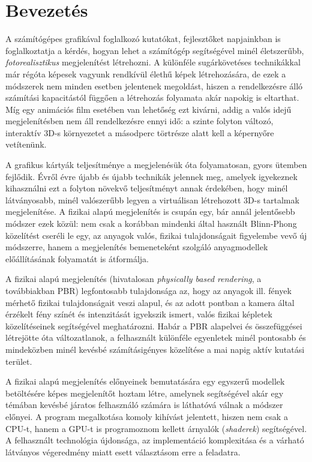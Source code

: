 \documentclass[12pt,oneside]{book}
\begin{document}
\chapter{Bevezetés}
A számítógépes grafikával foglalkozó kutatókat, fejlesztőket napjainkban is foglalkoztatja a kérdés, hogyan lehet a számítógép segítségével minél életszerűbb, \textit{fotorealisztikus} megjelenítést létrehozni. A különféle sugárkövetéses technikákkal már régóta képesek vagyunk rendkívül élethű képek létrehozására, de ezek a módszerek nem minden esetben jelentenek megoldást, hiszen a rendelkezésre álló számítási kapacitástól függően a létrehozás folyamata akár napokig is eltarthat. Míg egy animációs film esetében van lehetőség ezt kivárni, addig a valós idejű megjelenítésben nem áll rendelkezésre ennyi idő: a szinte folyton változó, interaktív 3D-s környezetet a másodperc törtrésze alatt kell a képernyőre vetítenünk.

A grafikus kártyák teljesítménye a megjelenésük óta folyamatosan, gyors ütemben fejlődik. Évről évre újabb és újabb technikák jelennek meg, amelyek igyekeznek kihasználni ezt a folyton növekvő teljesítményt annak érdekében, hogy minél látványosabb, minél valószerűbb legyen a virtuálisan létrehozott 3D-s tartalmak megjelenítése. A fizikai alapú megjelenítés is csupán egy, bár annál jelentősebb módszer ezek közül: nem csak a korábban mindenki által használt Blinn-Phong közelítést cseréli le egy, az anyagok valós, fizikai tulajdonságait figyelembe vevő új módszerre, hanem a megjelenítés bemeneteként szolgáló anyagmodellek előállításának folyamatát is átformálja.

A fizikai alapú megjelenítés (hivatalosan \textit{physically based rendering}, a továbbiakban PBR) legfontosabb tulajdonsága az, hogy az anyagok ill. fények mérhető fizikai tulajdonságait veszi alapul, és az adott pontban a kamera által érzékelt fény színét és intenzitását igyekszik ismert, valós fizikai képletek közelítéseinek segítségével meghatározni. Habár a PBR alapelvei és összefüggései létrejötte óta változatlanok, a felhasznált különféle egyenletek minél pontosabb és mindeközben minél kevésbé számításigényes közelítése a mai napig aktív kutatási terület.

A fizikai alapú megjelenítés előnyeinek bemutatására egy egyszerű modellek betöltésére képes megjelenítőt hoztam létre, amelynek segítségével akár egy témában kevésbé járatos felhasználó számára is láthatóvá válnak a módszer előnyei. A program megalkotása komoly kihívást jelentett, hiszen nem csak a CPU-t, hanem a GPU-t is programoznom kellett árnyalók (\textit{shaderek}) segítségével. A felhasznált technológia újdonsága, az implementáció komplexitása és a várható látványos végeredmény miatt esett választásom erre a feladatra.
\end{document}
